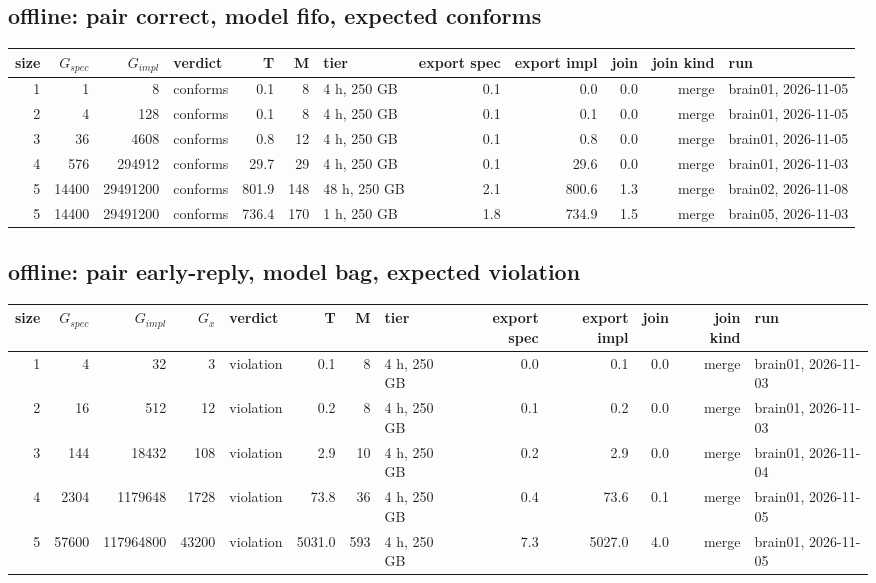 \documentclass[10pt]{article}
\begin{document}
\subsection*{offline: pair \textsf{correct}, model fifo, expected conforms}
\begin{longtable}{@{}rrrlrrlrrrrl@{}}
\toprule
size & $G_{\mathit{spec}}$ & $G_{\mathit{impl}}$ & verdict & T & M & tier & export spec & export impl & join & join kind & run \\
\midrule
\endhead
\color{blue} 1 & 1 & 8 & conforms & 0.1 & 8 & 4 h, 250 GB & 0.1 & 0.0 & 0.0 & merge & brain01, 2026-11-05 \\
\color{blue} 2 & 4 & 128 & conforms & 0.1 & 8 & 4 h, 250 GB & 0.1 & 0.1 & 0.0 & merge & brain01, 2026-11-05 \\
\color{blue} 3 & 36 & 4608 & conforms & 0.8 & 12 & 4 h, 250 GB & 0.1 & 0.8 & 0.0 & merge & brain01, 2026-11-05 \\
\color{blue} 4 & 576 & 294912 & conforms & 29.7 & 29 & 4 h, 250 GB & 0.1 & 29.6 & 0.0 & merge & brain01, 2026-11-03 \\
\color{blue} 5 & 14400 & 29491200 & conforms & 801.9 & 148 & 48 h, 250 GB & 2.1 & 800.6 & 1.3 & merge & brain02, 2026-11-08 \\
\color{red} 5 & 14400 & 29491200 & conforms & 736.4 & 170 & 1 h, 250 GB & 1.8 & 734.9 & 1.5 & merge & brain05, 2026-11-03 \\
\bottomrule
\end{longtable}
\subsection*{offline: pair \textsf{early-reply}, model bag, expected violation}
\begin{longtable}{@{}rrrrlrrlrrrrl@{}}
\toprule
size & $G_{\mathit{spec}}$ & $G_{\mathit{impl}}$ & $G_x$ & verdict & T & M & tier & export spec & export impl & join & join kind & run \\
\midrule
\endhead
\color{blue} 1 & 4 & 32 & 3 & violation & 0.1 & 8 & 4 h, 250 GB & 0.0 & 0.1 & 0.0 & merge & brain01, 2026-11-03 \\
\color{blue} 2 & 16 & 512 & 12 & violation & 0.2 & 8 & 4 h, 250 GB & 0.1 & 0.2 & 0.0 & merge & brain01, 2026-11-03 \\
\color{blue} 3 & 144 & 18432 & 108 & violation & 2.9 & 10 & 4 h, 250 GB & 0.2 & 2.9 & 0.0 & merge & brain01, 2026-11-04 \\
\color{blue} 4 & 2304 & 1179648 & 1728 & violation & 73.8 & 36 & 4 h, 250 GB & 0.4 & 73.6 & 0.1 & merge & brain01, 2026-11-05 \\
\color{blue} 5 & 57600 & 117964800 & 43200 & violation & 5031.0 & 593 & 4 h, 250 GB & 7.3 & 5027.0 & 4.0 & merge & brain01, 2026-11-05 \\
\bottomrule
\end{longtable}
\end{document}

